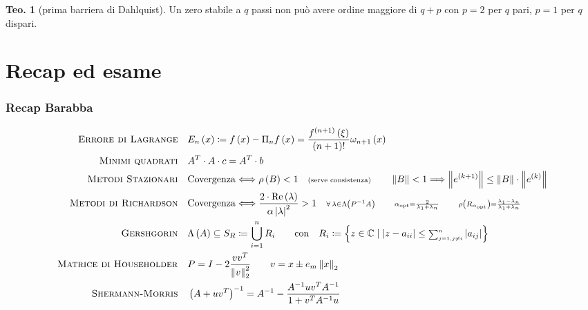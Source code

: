 \documentclass[a4paper,10pt]{article}
\theoremstyle{definition}
\theoremstyle{indentdefinition}
\theoremstyle{indenttheorem}
\newtheorem{thm}{Teo.}
\theoremstyle{myremark}
\theoremstyle{indentgeneral}
\theoremstyle{plain}
\theoremstyle{plain}
\begin{document}
\begin{thm}[prima barriera di Dahlquist]
Un  zero stabile a $q$ passi non
può avere ordine maggiore di $q+p$ con $p=2$ per $q$ pari, $p=1$
per $q$ dispari.
\end{thm}

\pagebreak{}



\part{Recap ed esame}
\section{Recap Barabba}

\begin{align*}
\text{\textsc{Errore di Lagrange}}\quad & E_{n}\left(x\right)\coloneqq f\left(x\right)-\Pi_{n}f\left(x\right)=\frac{f^{\left(n+1\right)}\left(\xi\right)}{\left(n+1\right)!}\omega_{n+1}\left(x\right)\\
\text{\textsc{Minimi quadrati}}\quad & A^{T}\cdot A\cdot c=A^{T}\cdot b\\
\text{\textsc{Metodi Stazionari}\quad} & \text{Covergenza}\Longleftrightarrow\rho\left(B\right)<1\quad{\scriptstyle \text{(serve consistenza)}}\qquad\left\Vert B\right\Vert <1\Longrightarrow\left\Vert e^{\left(k+1\right)}\right\Vert \leq\left\Vert B\right\Vert \cdot\left\Vert e^{\left(k\right)}\right\Vert \\
\text{\textsc{Metodi di Richardson}\quad} & \text{Covergenza}\Longleftrightarrow\frac{2\cdot\Re\left(\lambda\right)}{\alpha\left|\lambda\right|^{2}}>1\quad{\scriptstyle \forall\,\lambda\in\Lambda\left(P^{-1}A\right)}\qquad{\scriptstyle \alpha_{\text{opt}}=\frac{2}{\lambda_{1}+\lambda_{n}}}\qquad{\scriptstyle \rho\left(R_{\alpha_{\text{opt}}}\right)=\frac{\lambda_{1}-\lambda_{n}}{\lambda_{1}+\lambda_{n}}}\\
\text{\textsc{Gershgorin}\quad} & \Lambda\left(A\right)\subseteq S_{R}\coloneqq\bigcup_{i=1}^{n}R_{i}\qquad\text{con}\quad R_{i}\coloneqq\left\{ z\in\mathbb{C}\mid\left|z-a_{ii}\right|\leq{\scriptstyle \sum_{j=1,j\neq i}^{n}}\left|a_{ij}\right|\right\} \\
\text{\textsc{Matrice di Householder}\quad} & P=I-2\frac{vv^{T}}{\left\Vert v\right\Vert _{2}^{2}}\qquad v=x\pm e_{m}\left\Vert x\right\Vert _{2}\\
\text{\textsc{Shermann-Morris}\quad} & \left(A+uv^{T}\right)^{-1}=A^{-1}-\frac{A^{-1}uv^{T}A^{-1}}{1+v^{T}A^{-1}u}\\

\end{align*}
\end{document}

